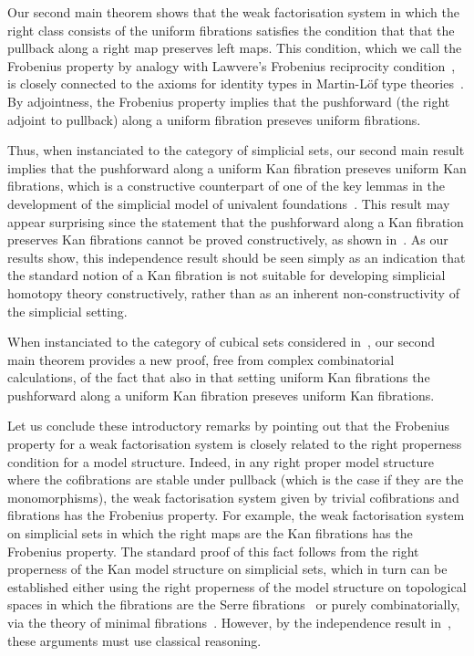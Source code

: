 \documentclass[reqno,10pt,a4paper,oneside]{amsart}
\begin{document}
Our second main theorem shows that the weak factorisation system in which the right class consists of the uniform fibrations satisfies the condition that that the pullback along a right map preserves 
left maps.  This condition, which we call the Frobenius property by  analogy with 
Lawvere's Frobenius reciprocity condition~\cite{lawvere-1969}, is closely connected to the axioms for identity types in Martin-L\"of type theories~\cite[Section~4]{gambino-garner:idtypewfs}.
By adjointness,  the Frobenius property implies that the pushforward (the right adjoint to
pullback) along a uniform fibration preseves uniform fibrations. 

Thus, when instanciated to the category of simplicial sets, our second main result implies that the  pushforward along a uniform Kan fibration preseves uniform Kan fibrations, which is a constructive counterpart of 
one of the key lemmas in the development of the simplicial model of univalent foundations~\cite[Lemma 2.3.1]{voevodsky-simplicial-model}. 
This result may appear surprising since the statement that the pushforward  along a Kan fibration 
preserves Kan fibrations cannot be proved constructively, as shown in~\cite{coquand-non-constructivity-kan}.
As our results show, this independence result
should be seen  simply as an indication that the standard notion of a Kan 
fibration is not suitable for developing simplicial homotopy theory constructively, rather than 
as an inherent non-constructivity of the simplicial setting. 

When instanciated to the category of cubical
sets considered in~\cite{coquand-variation}, our second main theorem provides a new proof, free from
complex combinatorial calculations, of the fact that also in that setting uniform Kan fibrations  the  
pushforward along a uniform Kan fibration preseves uniform Kan fibrations. 

Let us conclude these introductory remarks by pointing out that the Frobenius property for a 
weak factorisation system is closely related to the right properness condition for a model 
structure. Indeed, in any right proper model structure where the cofibrations are stable under
pullback (which is the case if they are the monomorphisms), the weak factorisation system 
given by trivial cofibrations and fibrations has the Frobenius property. For example, the weak factorisation system on simplicial sets in which the right maps are the Kan fibrations has the Frobenius property. 
The standard proof of this fact follows from the right properness of the Kan model structure on simplicial
sets, which in turn can be established either using the right properness of the model structure on topological spaces in which  the fibrations are the Serre fibrations~\cite[Theorem~13.1.13]{hirschhorn-model-localizations} or purely combinatorially, via the theory of minimal fibrations~\cite[Theorem~1.7.1]{joyal-tierney-notes}. However,
by the independence result in~\cite{coquand-non-constructivity-kan}, these arguments must use classical reasoning.
\end{document}
